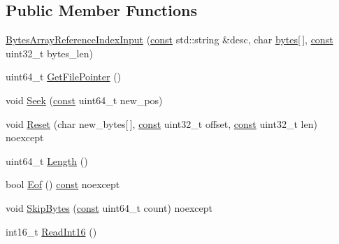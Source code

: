 \subsection*{Public Member Functions}
\begin{DoxyCompactItemize}
\item 
\mbox{\hyperlink{classlucene_1_1core_1_1store_1_1BytesArrayReferenceIndexInput_a32de06fdcb8b4867db1501a75ee7cf95}{Bytes\+Array\+Reference\+Index\+Input}} (\mbox{\hyperlink{ZlibCrc32_8h_a2c212835823e3c54a8ab6d95c652660e}{const}} std\+::string \&desc, char \mbox{\hyperlink{classlucene_1_1core_1_1store_1_1BytesArrayReferenceIndexInput_aafe03354e9d36c3ddf3eb3cfdfa8c272}{bytes}}\mbox{[}$\,$\mbox{]}, \mbox{\hyperlink{ZlibCrc32_8h_a2c212835823e3c54a8ab6d95c652660e}{const}} uint32\+\_\+t bytes\+\_\+len)
\item 
uint64\+\_\+t \mbox{\hyperlink{classlucene_1_1core_1_1store_1_1BytesArrayReferenceIndexInput_ad898d763272afa0b81b9d376ef398389}{Get\+File\+Pointer}} ()
\item 
void \mbox{\hyperlink{classlucene_1_1core_1_1store_1_1BytesArrayReferenceIndexInput_a89d5954669ecb74ed5a32805581c96d0}{Seek}} (\mbox{\hyperlink{ZlibCrc32_8h_a2c212835823e3c54a8ab6d95c652660e}{const}} uint64\+\_\+t new\+\_\+pos)
\item 
void \mbox{\hyperlink{classlucene_1_1core_1_1store_1_1BytesArrayReferenceIndexInput_a09649e59cd90c6d0ab6ecbc01bed7a9a}{Reset}} (char new\+\_\+bytes\mbox{[}$\,$\mbox{]}, \mbox{\hyperlink{ZlibCrc32_8h_a2c212835823e3c54a8ab6d95c652660e}{const}} uint32\+\_\+t offset, \mbox{\hyperlink{ZlibCrc32_8h_a2c212835823e3c54a8ab6d95c652660e}{const}} uint32\+\_\+t len) noexcept
\item 
uint64\+\_\+t \mbox{\hyperlink{classlucene_1_1core_1_1store_1_1BytesArrayReferenceIndexInput_a964569c2c6cebb225bb7d271fa1e7132}{Length}} ()
\item 
bool \mbox{\hyperlink{classlucene_1_1core_1_1store_1_1BytesArrayReferenceIndexInput_a5d8ad48b11832f4c035b1d23184379c7}{Eof}} () \mbox{\hyperlink{ZlibCrc32_8h_a2c212835823e3c54a8ab6d95c652660e}{const}} noexcept
\item 
void \mbox{\hyperlink{classlucene_1_1core_1_1store_1_1BytesArrayReferenceIndexInput_a4184f98a59e69b523418e121188fac93}{Skip\+Bytes}} (\mbox{\hyperlink{ZlibCrc32_8h_a2c212835823e3c54a8ab6d95c652660e}{const}} uint64\+\_\+t count) noexcept
\item 
int16\+\_\+t \mbox{\hyperlink{classlucene_1_1core_1_1store_1_1BytesArrayReferenceIndexInput_ab8c3794f54c8695921ccabdf0111ebed}{Read\+Int16}} ()

\end{DoxyCompactItemize}
